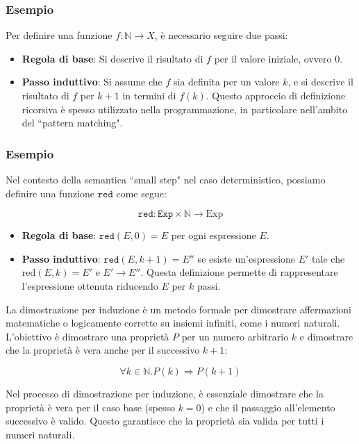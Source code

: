 \subsubsection{Esempio}
Per definire una funzione $f: \mathbb{N} \rightarrow X$, è necessario seguire due passi:

\begin{itemize}
  \item \textbf{Regola di base}: Si descrive il risultato di $f$ per il valore iniziale, ovvero $0$.

  \item \textbf{Passo induttivo}: Si assume che $f$ sia definita per un valore $k$, e si
  descrive il risultato di $f$ per $k+1$ in termini di $f(k)$. Questo approccio di definizione
  ricorsiva è spesso utilizzato nella programmazione, in particolare nell'ambito del ``pattern matching".
\end{itemize}

\subsubsection{Esempio}
Nel contesto della semantica ``small step" nel caso deterministico,
possiamo definire una funzione $\texttt{red}$ come segue:

\[
\texttt{red}: \texttt{Exp} \times \mathbb{N} \rightarrow \text{Exp}
\]

\begin{itemize}
  \item \textbf{Regola di base}: $\texttt{red}(E,0) = E$ per ogni espressione $E$.

  \item \textbf{Passo induttivo}: $\texttt{red}(E,k+1) = E''$ se esiste un'espressione
  $E'$ tale che $\text{red}(E,k) = E'$ e $E' \rightarrow E''$. Questa definizione permette
  di rappresentare l'espressione ottenuta riducendo $E$ per $k$ passi.

\end{itemize}

La dimostrazione per induzione è un metodo formale per dimostrare affermazioni matematiche
o logicamente corrette su insiemi infiniti, come i numeri naturali. L'obiettivo è dimostrare
una proprietà $P$ per un numero arbitrario $k$ e dimostrare che la proprietà è vera anche per
il successivo $k+1$:

\[
\forall k \in \mathbb{N}. P(k) \Rightarrow P(k+1)
\]

Nel processo di dimostrazione per induzione, è essenziale dimostrare che la proprietà è vera per il caso base (spesso $k = 0$) e che il passaggio all'elemento successivo è valido. Questo garantisce che la proprietà sia valida per tutti i numeri naturali.
